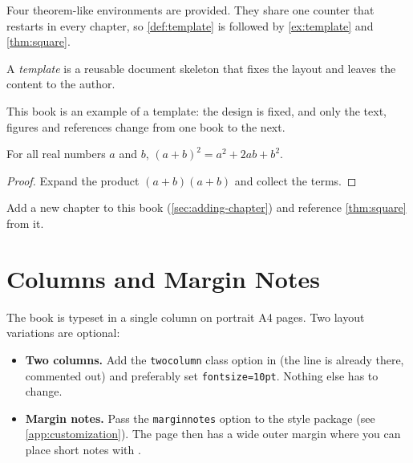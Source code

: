 Four theorem-like environments are provided. They share one counter that
restarts in every chapter, so \cref{def:template} is followed by
\cref{ex:template} and \cref{thm:square}.

\begin{definition}[Template]\label{def:template}
A \emph{template} is a reusable document skeleton that fixes the layout and
leaves the content to the author.
\end{definition}

\begin{example}\label{ex:template}
This book is an example of a template: the design is fixed, and only the
text, figures and references change from one book to the next.
\end{example}

\begin{theorem}\label{thm:square}
For all real numbers $a$ and $b$, $(a+b)^2 = a^2 + 2ab + b^2$.
\end{theorem}

\begin{proof}
Expand the product $(a+b)(a+b)$ and collect the terms.
\end{proof}

\begin{exercise}\label{ex:practice}
Add a new chapter to this book (\cref{sec:adding-chapter}) and reference
\cref{thm:square} from it.
\end{exercise}

\section{Columns and Margin Notes}\label{sec:layout}

The book is typeset in a single column on portrait A4 pages. Two layout
variations are optional:

\begin{itemize}
  \item \textbf{Two columns.} Add the \texttt{twocolumn} class option in
         (the line is already there, commented out) and
        preferably set \texttt{fontsize=10pt}. Nothing else has to change.
  \item \textbf{Margin notes.} Pass the \texttt{marginnotes} option to the
        style package (see \cref{app:customization}). The page then has a wide
        outer margin where you can place short notes with .
\end{itemize}

